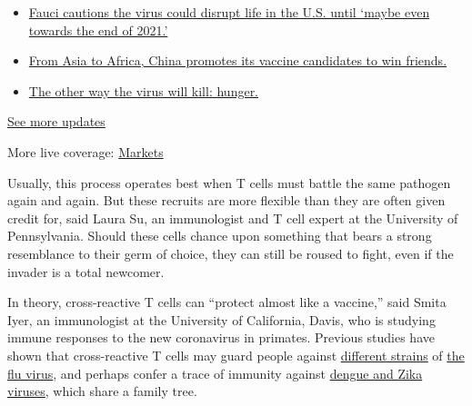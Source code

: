 \begin{itemize}
\tightlist
\item
  \href{https://www.nytimes3xbfgragh.onion/2020/09/11/world/covid-19-coronavirus.html?action=click\&pgtype=Article\&state=default\&region=MAIN_CONTENT_1\&context=storylines_live_updates\#link-dfb8a16}{Fauci
  cautions the virus could disrupt life in the U.S. until `maybe even
  towards the end of 2021.'}
\item
  \href{https://www.nytimes3xbfgragh.onion/2020/09/11/world/covid-19-coronavirus.html?action=click\&pgtype=Article\&state=default\&region=MAIN_CONTENT_1\&context=storylines_live_updates\#link-7104d154}{From
  Asia to Africa, China promotes its vaccine candidates to win friends.}
\item
  \href{https://www.nytimes3xbfgragh.onion/2020/09/11/world/covid-19-coronavirus.html?action=click\&pgtype=Article\&state=default\&region=MAIN_CONTENT_1\&context=storylines_live_updates\#link-393ad215}{The
  other way the virus will kill: hunger.}
\end{itemize}

\href{https://www.nytimes3xbfgragh.onion/2020/09/11/world/covid-19-coronavirus.html?action=click\&pgtype=Article\&state=default\&region=MAIN_CONTENT_1\&context=storylines_live_updates}{See
more updates}

More live coverage:
\href{https://www.nytimes3xbfgragh.onion/live/2020/09/11/business/stock-market-today-coronavirus?action=click\&pgtype=Article\&state=default\&region=MAIN_CONTENT_1\&context=storylines_live_updates}{Markets}

Usually, this process operates best when T cells must battle the same
pathogen again and again. But these recruits are more flexible than they
are often given credit for, said Laura Su, an immunologist and T cell
expert at the University of Pennsylvania. Should these cells chance upon
something that bears a strong resemblance to their germ of choice, they
can still be roused to fight, even if the invader is a total newcomer.

In theory, cross-reactive T cells can ``protect almost like a vaccine,''
said Smita Iyer, an immunologist at the University of California, Davis,
who is studying immune responses to the new coronavirus in primates.
Previous studies have shown that cross-reactive T cells may guard people
against
\href{https://www.ncbi.nlm.nih.gov/pmc/articles/PMC6303473/}{different
strains} of
\href{https://www.ncbi.nlm.nih.gov/pmc/articles/PMC6458262/}{the flu
virus}, and perhaps confer a trace of immunity against
\href{https://www.frontiersin.org/articles/10.3389/fimmu.2020.00517/full}{dengue
and Zika viruses}, which share a family tree.

